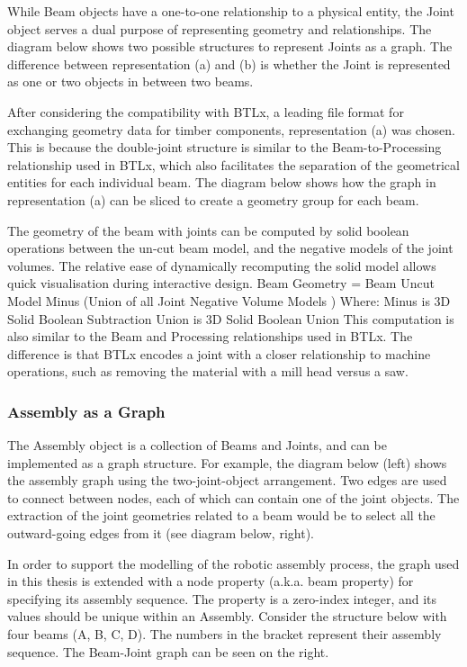 While Beam objects have a one-to-one relationship to a physical entity, the Joint object serves a dual purpose of representing geometry and relationships. The diagram below shows two possible structures to represent Joints as a graph. The difference between representation (a) and (b) is whether the Joint is represented as one or two objects in between two beams.

After considering the compatibility with BTLx, a leading file format for exchanging geometry data for timber components, representation (a) was chosen. This is because the double-joint structure is similar to the Beam-to-Processing relationship used in BTLx, which also facilitates the separation of the geometrical entities for each individual beam. The diagram below shows how the graph in representation (a) can be sliced to create a geometry group for each beam.

The geometry of the beam with joints can be computed by solid boolean operations between the un-cut beam model, and the negative models of the joint volumes. The relative ease of dynamically recomputing the solid model allows quick visualisation during interactive design.
Beam Geometry = Beam Uncut Model Minus (Union of all Joint Negative Volume Models )
Where: 
Minus is 3D Solid Boolean Subtraction
Union is 3D Solid Boolean Union
This computation is also similar to the Beam and Processing relationships used in BTLx. The difference is that BTLx encodes a joint with a closer relationship to machine operations, such as removing the material with a mill head versus a saw.

\subsubsection{Assembly as a Graph}
\label{subsubsection:exploration-2-assembly-as-a-graph}

The Assembly object is a collection of Beams and Joints, and can be implemented as a graph structure. For example, the diagram below (left) shows the assembly graph using the two-joint-object arrangement. Two edges are used to connect between nodes, each of which can contain one of the joint objects. The extraction of the joint geometries related to a beam would be to select all the outward-going edges from it (see diagram below, right).

In order to support the modelling of the robotic assembly process, the graph used in this thesis is extended with a node property (a.k.a. beam property) for specifying its assembly sequence. The property is a zero-index integer, and its values should be unique within an Assembly. Consider the structure below with four beams (A, B, C, D). The numbers in the bracket represent their assembly sequence. The Beam-Joint graph can be seen on the right.


